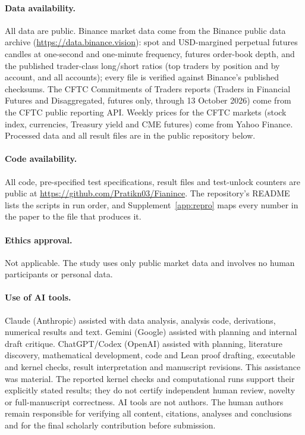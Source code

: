 \documentclass[12pt]{article}
\theoremstyle{definition}
\theoremstyle{remark}
\begin{document}
\paragraph{Data availability.} All data are public. Binance market data come from the Binance public data archive (\url{https://data.binance.vision}): spot and USD-margined perpetual futures candles at one-second and one-minute frequency, futures order-book depth, and the published trader-class long/short ratios (top traders by position and by account, and all accounts); every file is verified against Binance's published checksums. The CFTC Commitments of Traders reports (Traders in Financial Futures and Disaggregated, futures only, through 13 October 2026) come from the CFTC public reporting API. Weekly prices for the CFTC markets (stock index, currencies, Treasury yield and CME futures) come from Yahoo Finance. Processed data and all result files are in the public repository below.

\paragraph{Code availability.} All code, pre-specified test specifications, result files and test-unlock counters are public at \url{https://github.com/Pratikn03/Fianince}. The repository's README lists the scripts in run order, and Supplement~\ref{app:repro} maps every number in the paper to the file that produces it.

\paragraph{Ethics approval.} Not applicable. The study uses only public market data and involves no human participants or personal data.

\paragraph{Use of AI tools.} Claude (Anthropic) assisted with data analysis, analysis code, derivations, numerical results and text. Gemini (Google) assisted with planning and internal draft critique. ChatGPT/Codex (OpenAI) assisted with planning, literature discovery, mathematical development, code and Lean proof drafting, executable and kernel checks, result interpretation and manuscript revisions. This assistance was material. The reported kernel checks and computational runs support their explicitly stated results; they do not certify independent human review, novelty or full-manuscript correctness. AI tools are not authors. The human authors remain responsible for verifying all content, citations, analyses and conclusions and for the final scholarly contribution before submission.
\end{document}
